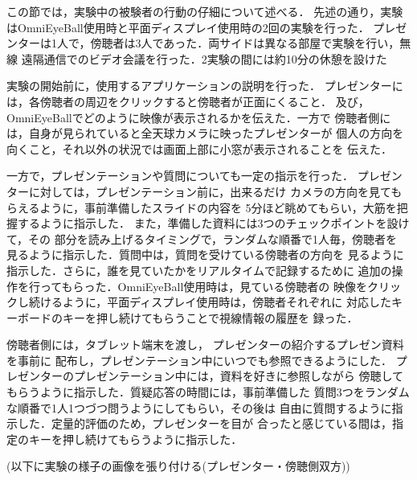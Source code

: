 \begin{comment}
・OEB使用時と平面ディスプレイ使用時の2回の実験を行った(プレゼンター1人，質問者3人)

・平面ディスプレイ使用の実験の後，10分程度の休憩時間を設け，OEBを使用する実験に移った

・実験の開始前に，使用するアプリケーションの操作説明を行った

・また，5分程度，事前準備したスライドの内容をある程度覚えてもらった(プレゼン中，出来るだけ映像の方を見てもらうため)

・プレゼンターは，プレゼン中，3つ存在するプレゼン内容のチャックポイントに合わせ，ランダムな順番で1人づつ，対応する被験者を見てもらった

・また，質問中は質問を受けている被検者の方向を見るように指示した

・OEB使用時は，見る被験者の映像をクリックし続けることで，視線情報のログを取った

・平面ディスプレイ使用中は，被検者それぞれに対応したキー(映像に移っている左の人間からA,S,D)を押しっぱなしにしてもらうことで視線情報のログを取った

・一方，質問者側の被験者3人には，プレゼン中はプレゼンを聴くように指示した

・質問は，事前に準備した質問3つをランダムな順番で行った(プレゼンターから質問するように促される)

・上記の質問が終わったのちは各質問者から自由に質問してもらい，プレゼンと質問合わせて約10分使用した
\end{comment}
この節では，実験中の被験者の行動の仔細について述べる．
先述の通り，実験はOmniEyeBall使用時と平面ディスプレイ使用時の2回の実験を行った．
プレゼンターは1人で，傍聴者は3人であった．両サイドは異なる部屋で実験を行い，無線
遠隔通信でのビデオ会議を行った．2実験の間には約10分の休憩を設けた

実験の開始前に，使用するアプリケーションの説明を行った．
プレゼンターには，各傍聴者の周辺をクリックすると傍聴者が正面にくること．
及び，OmniEyeBallでどのように映像が表示されるかを伝えた．一方で
傍聴者側には，自身が見られていると全天球カメラに映ったプレゼンターが
個人の方向を向くこと，それ以外の状況では画面上部に小窓が表示されることを
伝えた．

一方で，プレゼンテーションや質問についても一定の指示を行った．
プレゼンターに対しては，プレゼンテーション前に，出来るだけ
カメラの方向を見てもらえるように，事前準備したスライドの内容を
5分ほど眺めてもらい，大筋を把握するように指示した．
また，準備した資料には3つのチェックポイントを設けて，その
部分を読み上げるタイミングで，ランダムな順番で1人毎，傍聴者を
見るように指示した．質問中は，質問を受けている傍聴者の方向を
見るように指示した．さらに，誰を見ていたかをリアルタイムで記録するために
追加の操作を行ってもらった．OmniEyeBall使用時は，見ている傍聴者の
映像をクリックし続けるように，平面ディスプレイ使用時は，傍聴者それぞれに
対応したキーボードのキーを押し続けてもらうことで視線情報の履歴を
録った．

傍聴者側には，タブレット端末を渡し，
プレゼンターの紹介するプレゼン資料を事前に
配布し，プレゼンテーション中にいつでも参照できるようにした．
プレゼンターのプレゼンテーション中には，資料を好きに参照しながら
傍聴してもらうように指示した．質疑応答の時間には，事前準備した
質問3つをランダムな順番で1人1つづつ問うようにしてもらい，その後は
自由に質問するように指示した．定量的評価のため，プレゼンターを目が
合ったと感じている間は，指定のキーを押し続けてもらうように指示した．

(以下に実験の様子の画像を張り付ける(プレゼンター・傍聴側双方))

